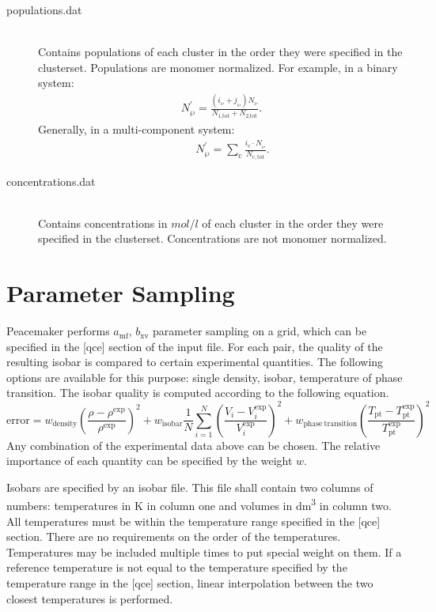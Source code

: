 \documentclass{scrartcl}
\newcommand{\amf}{a_\mathrm{mf}}
\newcommand{\bxv}{b_\mathrm{xv}}
\begin{document}
\begin{description}
        \vspace{0.1cm}
    \item[populations.dat] \hfill \\
        Contains populations of each cluster in the order they were specified in the clusterset.
        Populations are monomer normalized.
        For example, in a binary system:
        \begin{align}
        N^\prime_\wp = \frac{\left(i_\wp+j_\wp\right)N_\wp}{N_\text{1,tot} + N_\text{2,tot}}.
        \end{align}
        Generally, in a multi-component system:
        \begin{align}
        \qquad N^\prime_\wp = \sum_\mathrm{c} \frac{i_\mathrm{c} \cdot N_\wp}{N_\mathrm{c,tot}}.
        \end{align}
        \vspace{0.1cm}
    \item[concentrations.dat] \hfill \\
        Contains concentrations in $\si{mol/l}$ of each cluster in the order they were specified in the clusterset.
        Concentrations are not monomer normalized.
\end{description}

\section{Parameter Sampling}
\label{sec:sampling}

Peacemaker performs $\amf$, $\bxv$ parameter sampling on a grid, which can be specified in the [qce] section of the input file.
For each pair, the quality of the resulting isobar is compared to certain experimental quantities.
The following options are available for this purpose: single density, isobar, temperature of phase transition.
The isobar quality is computed according to the following equation.
\begin{equation*}
    \mathrm{error} = w_\mathrm{density}                                      {\left(\frac{\rho - \rho^\mathrm{exp}}{\rho^\mathrm{exp}}\right)}^2
                   + w_\mathrm{isobar}            \frac{1}{N} \sum_{i=1}^{N} {\left(\frac{V_i - V_i^\mathrm{exp}}{V_i^\mathrm{exp}}\right)}^2
                   + w_\mathrm{phase\ transition}                            {\left(\frac{T_\mathrm{pt}-T_\mathrm{pt}^\mathrm{exp}}{T_\mathrm{pt}^\mathrm{exp}}\right)}^2
\end{equation*}
Any combination of the experimental data above can be chosen.
The relative importance of each quantity can be specified by the weight $w$.

Isobars are specified by an isobar file.
This file shall contain two columns of numbers: temperatures in \si{K} in column one and volumes in \si{\cubic\deci\meter} in column two.
All temperatures must be within the temperature range specified in the [qce] section.
There are no requirements on the order of the temperatures.
Temperatures may be included multiple times to put special weight on them.
If a reference temperature is not equal to the temperature specified by the temperature range in the [qce] section, linear interpolation between the two closest temperatures is performed.
\end{document}
